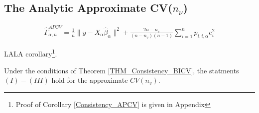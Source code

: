 \documentclass[Research_Module_ES.tex]{subfiles}
\begin{document}
\subsection{The Analytic Approximate CV($n_\nu$)}
\begin{align*}
\hat{\Gamma}_{\alpha,n}^{APCV}=\frac{1}{n}\lVert y-X_\alpha\hat{\beta}_\alpha\rVert^2 + \frac{2n-n_v}{(n-n_v)(n-1)}\sum_{i=1}^np_{i,i,\alpha}e_i^2
\end{align*}

LALA corollary\footnote{Proof of Corollary \ref{Consistency_APCV} is given in Appendix }.

\begin{coro}
\label{Consistency_APCV}
Under the conditions of Theorem \ref{THM_Consistency_BICV}, the statments $(I)-(III)$ hold for the approximate $CV(n_v)$.
\end{coro}
\end{document}
